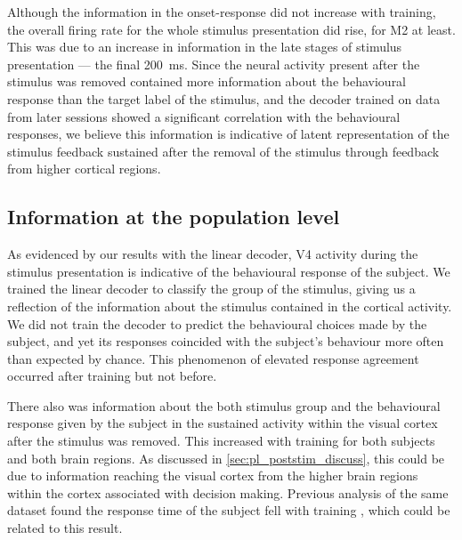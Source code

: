 Although the information in the onset-response did not increase with training, the overall firing rate for the whole stimulus presentation did rise, for \ac{M2} at least.
This was due to an increase in information in the late stages of stimulus presentation --- the final \SI{200}{\milli\second}.
Since the neural activity present after the stimulus was removed contained more information about the behavioural response than the target label of the stimulus, and the decoder trained on data from later sessions showed a significant correlation with the behavioural responses, we believe this information is indicative of latent representation of the stimulus feedback sustained after the removal of the stimulus through feedback from higher cortical regions.


\subsection{Information at the population level}

As evidenced by our results with the linear decoder, \ac{V4} activity during the stimulus presentation is indicative of the behavioural response of the subject.
We trained the linear decoder to classify the group of the stimulus, giving us a reflection of the information about the stimulus contained in the cortical activity.
We did not train the decoder to predict the behavioural choices made by the subject, and yet its responses coincided with the subject's behaviour more often than expected by chance.
This phenomenon of elevated response agreement occurred after training but not before.

There also was information about the both stimulus group and the behavioural response given by the subject in the sustained activity within the visual cortex after the stimulus was removed.
This increased with training for both subjects and both brain regions.
As discussed in \autoref{sec:pl_poststim_discuss}, this could be due to information reaching the visual cortex from the higher brain regions within the cortex associated with decision making.
Previous analysis of the same dataset found the response time of the subject fell with training \citep{Chen2013,Chen2013thesis}, which could be related to this result.

